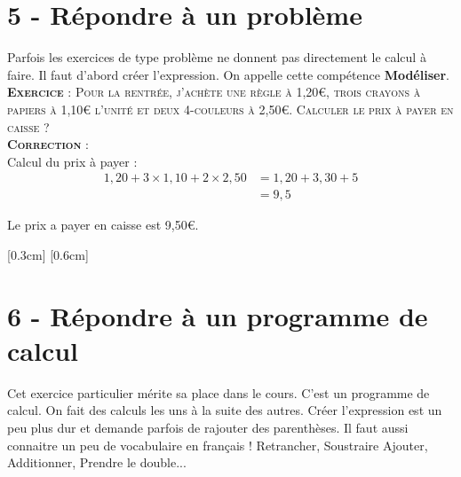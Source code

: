 \documentclass[11pt]{article}
\begin{document}
\newpage

\section*{5 - Répondre à un problème}

Parfois les exercices de type problème ne donnent pas directement le calcul à faire. Il faut d'abord créer l'expression. On appelle cette compétence \textbf{Modéliser}.\\

\textsc{\textbf{Exercice} : Pour la rentrée, j'achète une règle à 1,20€, trois crayons à papiers à 1,10€ l'unité et deux 4-couleurs à 2,50€.} \newline
\textsc{Calculer le prix à payer en caisse ?}\\

\textsc{\textbf{Correction} :}\\

Calcul du prix à payer :
\begin{align*}
1,20 + 3 \times 1,10 + 2 \times 2,50 &= 1,20 + 3,30 + 5 \\
                                     &= 9,5
\end{align*}

Le prix a payer en caisse est 9,50€.



\begin{center}
\reversemarginpar\marginnote{$\Box \Box$}
\reversemarginpar\marginnote{$\Box \Box$}[0.3cm]
\reversemarginpar\marginnote{$\Box \Box$}[0.6cm]
\end{center}


\section*{6 - Répondre à un programme de calcul}

Cet exercice particulier mérite sa place dans le cours. C'est un programme de calcul. On fait des calculs les uns à la suite des autres. Créer l'expression est un peu plus dur et demande parfois de rajouter des parenthèses. Il faut aussi connaitre un peu de vocabulaire en français ! Retrancher, Soustraire Ajouter, Additionner, Prendre le double... \\
\end{document}

